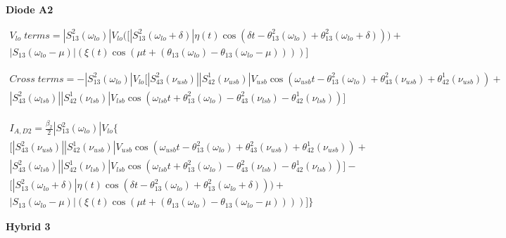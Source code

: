 \vspace{0.5cm}
\textbf{Diode A2}
\vspace{0.5cm}

\begin{equation}
\begin{gathered}
    V_{lo}\;terms = |S_{13}^2(\omega_{lo})|V_{lo}\big([ |S_{13}^2(\omega_{lo}+\delta)|\eta(t)
    \cos(\delta t-\theta_{13}^2(\omega_{lo})+\theta_{13}^2(\omega_{lo}+\delta))) + \\
    |S_{13}(\omega_{lo}-\mu)|(\xi(t)\cos(\mu t+(\theta_{13}(\omega_{lo})-\theta_{13}(\omega_{lo}-\mu))))
    \big]
\end{gathered}
\end{equation}

\begin{equation}
    \begin{gathered}
        Cross\;terms = -|S_{13}^2(\omega_{lo})|V_{lo} \big[ 
        |S_{43}^2(\nu_{usb})||S_{42}^1(\nu_{usb})|V_{usb}\cos(\omega_{usb}t-\theta_{13}^2(\omega_{lo})+\theta_{43}^2(\nu_{usb})+\theta_{42}^1(\nu_{usb}))+\\|S_{43}^2(\omega_{lsb})||S_{42}^1(\nu_{lsb})|V_{lsb}\cos(\omega_{lsb}t+\theta_{13}^2(\omega_{lo})-\theta_{43}^2(\nu_{lsb})-\theta_{42}^1(\nu_{lsb})) \big]
    \end{gathered}
\end{equation}


\begin{equation}
\label{eq:i_ad2}
\boxed{
    \begin{gathered}
        I_{A,D2} = \frac{\beta_{2}}{2} |S_{13}^2(\omega_{lo})|V_{lo} \big\{ \\
    \big[ 
    |S_{43}^2(\nu_{usb})||S_{42}^1(\nu_{usb})|V_{usb}\cos(\omega_{usb}t-\theta_{13}^2(\omega_{lo})+\theta_{43}^2(\nu_{usb})+\theta_{42}^1(\nu_{usb}))+\\|S_{43}^2(\omega_{lsb})||S_{42}^1(\nu_{lsb})|V_{lsb}\cos(\omega_{lsb}t+\theta_{13}^2(\omega_{lo})-\theta_{43}^2(\nu_{lsb})-\theta_{42}^1(\nu_{lsb})) \big] - \\
    \big[ 
    |S_{13}^2(\omega_{lo}+\delta)|\eta(t)
    \cos(\delta t-\theta_{13}^2(\omega_{lo})+\theta_{13}^2(\omega_{lo}+\delta))) + \\
    |S_{13}(\omega_{lo}-\mu)|(\xi(t)\cos(\mu t+(\theta_{13}(\omega_{lo})-\theta_{13}(\omega_{lo}-\mu)))) \big]
    \big\}
    \end{gathered}
    }
\end{equation}


\vspace{0.5cm}
\textbf{Hybrid 3}
\vspace{0.5cm}


